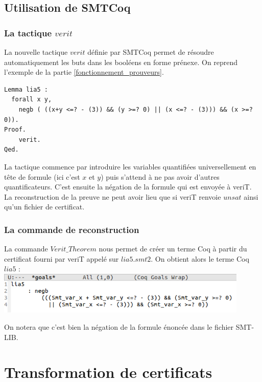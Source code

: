 \documentclass[11pt]{article}
\begin{document}
\subsection{Utilisation de SMTCoq}

\subsubsection{La tactique $verit$}

La nouvelle tactique $verit$ définie par SMTCoq permet de résoudre automatiquement les buts dans les booléens en forme prénexe. On reprend l'exemple de la partie \ref{fonctionnement_prouveurs}.

\begin{lstlisting}[frame=single]
Lemma lia5 : 
  forall x y,
    negb ( ((x+y <=? - (3)) && (y >=? 0) || (x <=? - (3))) && (x >=? 0)).
Proof.
    verit.
Qed.
\end{lstlisting}

La tactique commence par introduire les variables quantifiées universellement en tête de formule (ici c'est $x$ et $y$) puis s'attend à ne pas avoir d'autres quantificateurs. C'est ensuite la négation de la formule qui est envoyée à veriT. La reconstruction de la preuve ne peut avoir lieu que si veriT renvoie $unsat$ ainsi qu'un fichier de certificat.

\subsubsection{La commande de reconstruction}

La commande $Verit\_Theorem$ nous permet de créer un terme Coq à partir du certificat fourni par veriT appelé sur $lia5.smt2$. On obtient alors le terme Coq $lia5$ : \\

\includegraphics[height=2cm]{checklia5.png}

On notera que c'est bien la négation de la formule énoncée dans le fichier SMT-LIB. 


\newpage
\section{Transformation de certificats}
\end{document}
